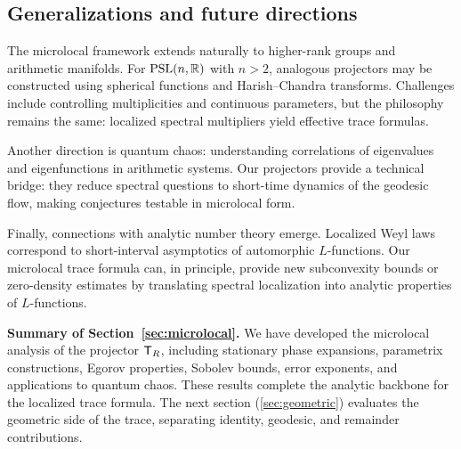 \subsection{Generalizations and future directions}\label{subsec:microlocal-future}

The microlocal framework extends naturally to higher-rank groups and arithmetic manifolds. For $\mathrm{PSL}(n,\mathbb{R})$ with $n>2$, analogous projectors may be constructed using spherical functions and Harish--Chandra transforms. Challenges include controlling multiplicities and continuous parameters, but the philosophy remains the same: localized spectral multipliers yield effective trace formulas.

Another direction is quantum chaos: understanding correlations of eigenvalues and eigenfunctions in arithmetic systems. Our projectors provide a technical bridge: they reduce spectral questions to short-time dynamics of the geodesic flow, making conjectures testable in microlocal form.

Finally, connections with analytic number theory emerge. Localized Weyl laws correspond to short-interval asymptotics of automorphic $L$-functions. Our microlocal trace formula can, in principle, provide new subconvexity bounds or zero-density estimates by translating spectral localization into analytic properties of $L$-functions.

\bigskip
\noindent\textbf{Summary of Section~\ref{sec:microlocal}.}
We have developed the microlocal analysis of the projector $\mathsf{T}_R$, including stationary phase expansions, parametrix constructions, Egorov properties, Sobolev bounds, error exponents, and applications to quantum chaos. These results complete the analytic backbone for the localized trace formula. The next section (\ref{sec:geometric}) evaluates the geometric side of the trace, separating identity, geodesic, and remainder contributions.
